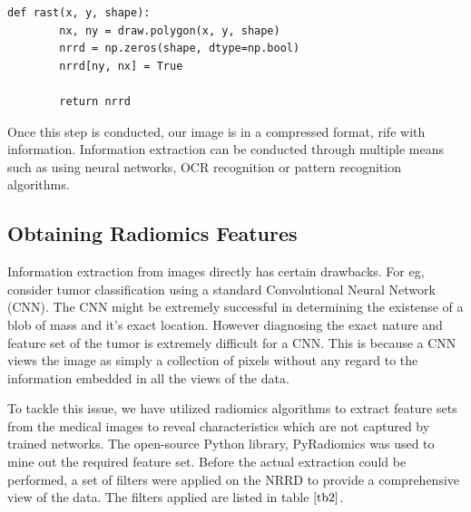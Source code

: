 \documentclass[10pt,journal,compsoc]{IEEEtran}
\begin{document}
\begin{verbatim}
def rast(x, y, shape):
        nx, ny = draw.polygon(x, y, shape)
        nrrd = np.zeros(shape, dtype=np.bool)
        nrrd[ny, nx] = True 

        return nrrd
\end{verbatim}

Once this step is conducted, our image is in a compressed format, rife with information. Information extraction can be conducted through multiple means such as using neural networks, OCR recognition or pattern recognition algorithms. 

\subsection{Obtaining Radiomics Features}

Information extraction from images directly has certain drawbacks. For eg, consider tumor classification using a standard Convolutional Neural Network (CNN). The CNN might be extremely successful in determining the existense of a blob of mass and it's exact location. However diagnosing the exact nature and feature set of the tumor is extremely difficult for a CNN. This is because a CNN views the image as simply a collection of pixels without any regard to the information embedded in all the views of the data. 

To tackle this issue, we have utilized radiomics algorithms to extract feature sets from the medical images to reveal characteristics which are not captured by trained networks. The open-source Python library, PyRadiomics was used to mine out the required feature set. Before the actual extraction could be performed, a set of filters were applied on the NRRD to provide a comprehensive view of the data. The filters applied are listed in table $\ref{tb2}$. 
\end{document}
